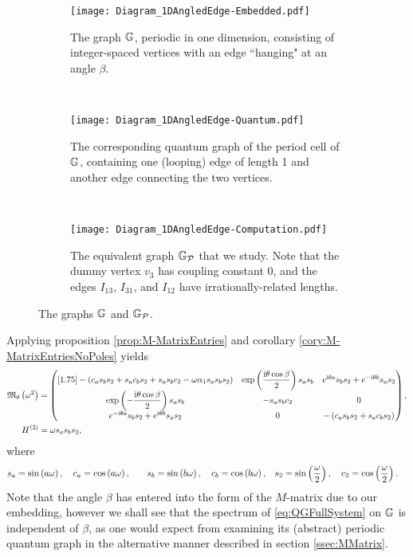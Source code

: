 \begin{figure}[t]
	\centering
	\begin{subfigure}[t]{0.3\textwidth}
		\centering
		\texttt{[image: Diagram\_1DAngledEdge-Embedded.pdf]}
		\caption{\label{fig:Diagram_1DAngledEdge-Embedded} The graph $\mathbb{G}$, periodic in one dimension, consisting of integer-spaced vertices with an edge ``hanging" at an angle $\beta$.}
	\end{subfigure}
	~
	\begin{subfigure}[t]{0.3\textwidth}
		\centering
		\texttt{[image: Diagram\_1DAngledEdge-Quantum.pdf]}
		\caption{\label{fig:Diagram_1DAngledEdge-Quantum} The corresponding quantum graph of the period cell of $\mathbb{G}$, containing one (looping) edge of length 1 and another edge connecting the two vertices.}
	\end{subfigure}
	~
	\begin{subfigure}[t]{0.3\textwidth}
		\centering
		\texttt{[image: Diagram\_1DAngledEdge-Computation.pdf]}	
		\caption{\label{fig:Diagram_1DAngledEdge-Computation} The equivalent graph $\mathbb{G}_{\mathcal{P}}$ that we study. Note that the dummy vertex $v_3$ has coupling constant 0, and the edges $I_{13}$, $I_{31}$, and $I_{12}$ have irrationally-related lengths.}
	\end{subfigure}
	\caption{\label{fig:Diagram_1DAngledEdgeExample} The graphs $\mathbb{G}$ and $\mathbb{G}_{\mathcal{P}}$.}
\end{figure}

Applying proposition \ref{prop:M-MatrixEntries} and corollary \ref{cory:M-MatrixEntriesNoPoles} yields
\begin{align*} 
	\mathfrak{M}_\theta\left( \omega^2 \right) &=
	\begin{pmatrix}[1.75]
		-\left( c_a s_b s_2 + s_a c_b s_2 + s_a s_b c_2 - \omega\alpha_1 s_a s_b s_2 \right) &
		\exp\left( \dfrac{\mathrm{i}\theta\cos\beta}{2} \right)s_a s_b &
		e^{\mathrm{i}\theta a}s_b s_2 + e^{-\mathrm{i}\theta b}s_a s_2 \\
		\exp\left( -\dfrac{\mathrm{i}\theta\cos\beta}{2} \right)s_a s_b &
		-s_a s_b c_2 &
		0 \\
		e^{-\mathrm{i}\theta a}s_b s_2 + e^{\mathrm{i}\theta b}s_a s_2 &
		0 &
		-\left( c_a s_b s_2 + s_a c_b s_2 \right)
	\end{pmatrix}, \\
	H^{(2)} &= \omega s_a s_b s_2,
\end{align*}
where
\begin{align*}
	s_a &= \sin\left( a\omega \right), \quad c_a = \cos\left( a\omega \right), &\quad
	s_b = \sin\left( b\omega \right), \quad c_b = \cos\left( b\omega \right), &\quad
	s_2 = \sin\left( \frac{\omega}{2} \right), \quad c_2 = \cos\left( \frac{\omega}{2} \right).
\end{align*}
Note that the angle $\beta$ has entered into the form of the $M$-matrix due to our embedding, however we shall see that the spectrum of \eqref{eq:QGFullSystem} on $\mathbb{G}$ is independent of $\beta$, as one would expect from examining its (abstract) periodic quantum graph in the alternative manner described in section \ref{ssec:MMatrix}.

